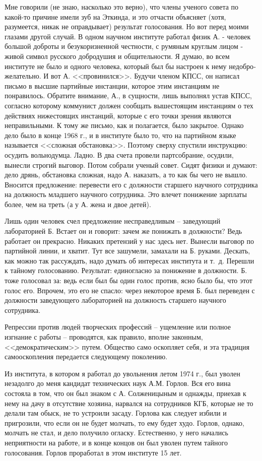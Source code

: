\documentclass{book}
\begin{document}
Мне говорили (не знаю, насколько это верно), что члены ученого совета по какой-то причине имели зуб на Эткинда, и это отчасти объясняет (хотя, разумеется, никак не оправды­вает) результат голосования. Но вот перед моими глазами другой случай. В одном научном институте работал физик А. - человек большой доброты и безукоризненной честности, с ру­мяным круглым лицом - живой символ русского доброду­шия и общительности. Я думаю, во всем институте не было и одного человека, который был бы настроен к нему недобро­желательно. И вот А. <<провинился>>. Будучи членом КПСС, он написал письмо в высшие партийные инстанции, которое этим инстанциям не понравилось. Обратите внимание, А., в сущ­ности, лишь выполнял устав КПСС, согласно которому комму­нист должен сообщать вышестоящим инстанциям о тех дейст­виях нижестоящих инстанций, которые с его точки зрения являются неправильными. К тому же письмо, как и полагает­ся, было закрытое. Однако дело было в конце 1968 г., и в институте было то, что на партийном языке называется <<слож­ная обстановка>>. Поэтому сверху спустили инструкцию: осу­дить вольнодумца. Ладно. В два счета провели партсобрание, осудили, вынесли строгий выговор. Потом собрали ученый со­вет. Сидят физики и думают: дело дрянь, обстановка сложная, надо А. наказать, а то как бы чего не вышло. Вносится предло­жение: перевести его с должности старшего научного сотруд­ника на должность младшего научного сотрудника. Это вле­чет понижение зарплаты более, чем на треть (а у А. жена и двое детей).

Лишь один человек счел предложение несправедливым -- заведующий лабораторией Б. Встает он и говорит: зачем же понижать в должности? Ведь работает он прекрасно. Никаких претензий у нас здесь нет. Вынесли выговор по партийной линии, и хватит.
Тут все зашумели, замахали на Б. руками. Дескать, как можно так рассуждать, надо думать об интересах института и т.~д. Перешли к тайному голосованию. Результат: единогласно за понижение в должности. Б. тоже голосовал за:  ведь если был бы один голос против, ясно было бы, что этот голос его. Впрочем, это его не спасло: через некоторое время Б. был переведен с должности заведующего лабораторией на должность старшего научного сотрудника.

Репрессии против людей творческих профессий -- ущемление или полное изгнание с работы -- проводятся, как правило, вполне законным, <<демократическим>> путем. Общество само оскопляет себя, и эта традиция самооскопления передается следующему поколению.

Из института, в котором я работал до увольнения летом 1974 г., был уволен незадолго до меня кандидат технических наук А.М. Горлов. Вся его вина состояла в том, что он был знаком с А. Солженицыным и однажды, приехав к нему на дачу в отсутствие хозяина, нарвался на сотрудников КГБ, которые не то делали там обыск, не то устроили засаду. Горлова как следует избили и пригрозили, что если он не будет молчать, то ему будет худо. Горлов, однако, молчать не стал, и дело получило огласку. Естественно, у него начались неприятности на работе, и в конце концов он был уволен путем тайного голосования. Горлов проработал в этом институте 15 лет.
\end{document}
